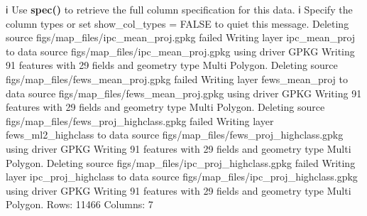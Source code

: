 \documentclass[
  a4paper,
]{article}
\newenvironment{Shaded}{\begin{snugshade}}{\end{snugshade}}
\newcommand{\ExtensionTok}[1]{#1}
\newcommand{\FunctionTok}[1]{\textcolor[rgb]{0.13,0.29,0.53}{\textbf{#1}}}
\newcommand{\KeywordTok}[1]{\textcolor[rgb]{0.13,0.29,0.53}{\textbf{#1}}}
\newcommand{\NormalTok}[1]{#1}
\newcommand{\StringTok}[1]{\textcolor[rgb]{0.31,0.60,0.02}{#1}}
\begin{document}
\begin{Shaded}
\begin{Highlighting}[]
\ExtensionTok{ℹ}\NormalTok{ Use }\KeywordTok{\textasciigrave{}}\FunctionTok{spec()}\KeywordTok{\textasciigrave{}}\NormalTok{ to retrieve the full column specification for this data.}
\ExtensionTok{ℹ}\NormalTok{ Specify the column types or set }\KeywordTok{\textasciigrave{}}\ExtensionTok{show\_col\_types}\NormalTok{ = FALSE}\KeywordTok{\textasciigrave{}}\NormalTok{ to quiet this message.}
\ExtensionTok{Deleting}\NormalTok{ source }\KeywordTok{\textasciigrave{}}\ExtensionTok{figs/map\_files/ipc\_mean\_proj.gpkg}\StringTok{\textquotesingle{} failed}
\StringTok{Writing layer \textasciigrave{}ipc\_mean\_proj\textquotesingle{}}\NormalTok{ to data source }\KeywordTok{\textasciigrave{}}\NormalTok{figs/map\_files/ipc\_mean\_proj.gpkg}\StringTok{\textquotesingle{} using driver \textasciigrave{}GPKG\textquotesingle{}}
\ExtensionTok{Writing}\NormalTok{ 91 features with 29 fields and geometry type Multi Polygon.}
\ExtensionTok{Deleting}\NormalTok{ source }\KeywordTok{\textasciigrave{}}\ExtensionTok{figs/map\_files/fews\_mean\_proj.gpkg}\StringTok{\textquotesingle{} failed}
\StringTok{Writing layer \textasciigrave{}fews\_mean\_proj\textquotesingle{}}\NormalTok{ to data source }\KeywordTok{\textasciigrave{}}\NormalTok{figs/map\_files/fews\_mean\_proj.gpkg}\StringTok{\textquotesingle{} using driver \textasciigrave{}GPKG\textquotesingle{}}
\ExtensionTok{Writing}\NormalTok{ 91 features with 29 fields and geometry type Multi Polygon.}
\ExtensionTok{Deleting}\NormalTok{ source }\KeywordTok{\textasciigrave{}}\ExtensionTok{figs/map\_files/fews\_proj\_highclass.gpkg}\StringTok{\textquotesingle{} failed}
\StringTok{Writing layer \textasciigrave{}fews\_ml2\_highclass\textquotesingle{}}\NormalTok{ to data source }\KeywordTok{\textasciigrave{}}\NormalTok{figs/map\_files/fews\_proj\_highclass.gpkg}\StringTok{\textquotesingle{} using driver \textasciigrave{}GPKG\textquotesingle{}}
\ExtensionTok{Writing}\NormalTok{ 91 features with 29 fields and geometry type Multi Polygon.}
\ExtensionTok{Deleting}\NormalTok{ source }\KeywordTok{\textasciigrave{}}\ExtensionTok{figs/map\_files/ipc\_proj\_highclass.gpkg}\StringTok{\textquotesingle{} failed}
\StringTok{Writing layer \textasciigrave{}ipc\_proj\_highclass\textquotesingle{}}\NormalTok{ to data source }\KeywordTok{\textasciigrave{}}\NormalTok{figs/map\_files/ipc\_proj\_highclass.gpkg}\StringTok{\textquotesingle{} using driver \textasciigrave{}GPKG\textquotesingle{}}
\ExtensionTok{Writing}\NormalTok{ 91 features with 29 fields and geometry type Multi Polygon.}
\ExtensionTok{Rows:}\NormalTok{ 11466 Columns: 7                                                                                               }

\end{Highlighting}
\end{Shaded}
\end{document}
